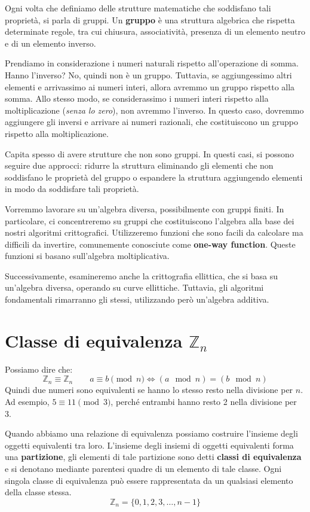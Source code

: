 Ogni volta che definiamo delle strutture matematiche che soddisfano tali proprietà, si parla di gruppi. Un \textbf{gruppo} è
una struttura algebrica che rispetta determinate regole, tra cui chiusura, associatività, presenza di un elemento neutro e di un elemento inverso.

Prendiamo in considerazione i numeri naturali rispetto all'operazione di somma. Hanno l'inverso? No, quindi non è un gruppo. Tuttavia,
se aggiungessimo altri elementi e arrivassimo ai numeri interi, allora avremmo un gruppo rispetto alla somma. Allo stesso modo, se
considerassimo i numeri interi rispetto alla moltiplicazione (\textit{senza lo zero}), non avremmo l'inverso. In questo caso, dovremmo aggiungere
gli inversi e arrivare ai numeri razionali, che costituiscono un gruppo rispetto alla moltiplicazione.

Capita spesso di avere strutture che non sono gruppi. In questi casi, si possono seguire due approcci: ridurre la struttura eliminando
gli elementi che non soddisfano le proprietà del gruppo o espandere la struttura aggiungendo elementi in modo da soddisfare tali proprietà.

Vorremmo lavorare su un'algebra diversa, possibilmente con gruppi finiti. In particolare, ci concentreremo su gruppi che costituiscono
l'algebra alla base dei nostri algoritmi crittografici. Utilizzeremo funzioni che sono facili da calcolare ma difficili da invertire,
comunemente conosciute come \textbf{one-way function}. Queste funzioni si basano sull'algebra moltiplicativa.

Successivamente, esamineremo anche la crittografia ellittica, che si basa su un'algebra diversa, operando su curve ellittiche. Tuttavia,
gli algoritmi fondamentali rimarranno gli stessi, utilizzando però un'algebra additiva.

\section{Classe di equivalenza $\mathbb{Z}_n$}
Possiamo dire che:
\[
  \mathbb{Z}_n \equiv \mathbb{Z}_n \qquad a \equiv b \pmod{n} \iff (a \mod n) = (b \mod n)
\]
Quindi due numeri sono equivalenti se hanno lo stesso resto nella divisione per $n$.
Ad esempio, $5 \equiv 11 \pmod{3}$, perché entrambi hanno resto 2 nella divisione per 3.

Quando abbiamo una relazione di equivalenza possiamo costruire l'insieme degli oggetti equivalenti tra loro. 
L'insieme degli insiemi di oggetti equivalenti forma una \textbf{partizione}, gli elementi di tale 
partizione sono detti \textbf{classi di equivalenza} e si denotano mediante parentesi quadre di un elemento di tale classe.
Ogni singola classe di equivalenza può essere rappresentata da un qualsiasi elemento della classe stessa. 
\[
  \mathbb{Z}_n = \{0,1,2,3,\dots, n-1\}
\]

